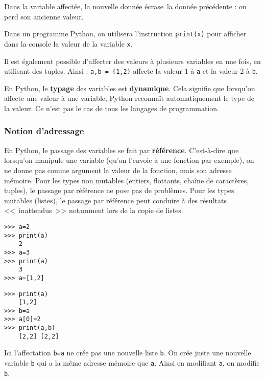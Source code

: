 Dans la variable affectée, la nouvelle donnée \og écrase\fg\ la donnée précédente : on perd son 
ancienne valeur.

Dans un programme Python, on utilisera l'instruction \texttt{print(x)}
pour afficher dans la console la valeur de la variable \texttt{x}.

Il est également possible d'affecter des valeurs à plusieurs variables en une fois, en utilisant 
des tuples. Ainsi : \texttt{a,b = (1,2)} affecte la valeur 1 à \texttt{a} et la valeur 2 à 
\texttt{b}.


\begin{remarque}
En Python, le \textbf{typage} des variables est \textbf{dynamique}. Cela signifie que lorsqu'on affecte une valeur à une variable, Python reconnaît automatiquement le type de la valeur. Ce n'est pas le cas de tous les langages de programmation.

\end{remarque}
\subsubsection*{Notion d'adressage}

En Python, le passage des variables se fait par \textbf{référence}. C'est-à-dire que lorsqu'on manipule une variable (qu'on l'envoie à une fonction par exemple), on ne donne pas comme argument la valeur de la fonction, mais son adresse mémoire. Pour les types non mutables (entiers, flottants, chaîne de caractères, tuples), le passage par référence ne pose pas de problèmes. Pour les types mutables (listes), le passage par référence peut conduire à des résultats <<~inattendus~>> notamment lors de la copie de listes. 


\begin{multicols}{2}
\begin{lstlisting}
>>> a=2
>>> print(a)
	2
>>> a=3
>>> print(a)
	3
>>> a=[1,2]
\end{lstlisting}

\begin{lstlisting}
>>> print(a)
	[1,2]
>>> b=a
>>> a[0]=2
>>> print(a,b)
	[2,2] [2,2]
\end{lstlisting}
\end{multicols}
Ici l'affectation \texttt{b=a} ne crée pas une nouvelle liste \texttt{b}. On crée juste une nouvelle variable \texttt{b} qui a la même adresse mémoire que \texttt{a}. Ainsi en modifiant \texttt{a}, on modifie \texttt{b}. 



